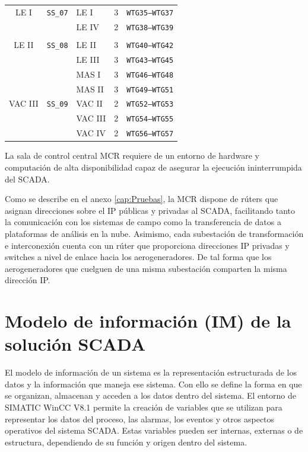 \begin{table}[tb]
{\begin{tabular}{cclcc}
                  &                 &  & &  \\ 
            \midrule
             LE I & \texttt{SS\_07} & LE I& 3 & \texttt{WTG35--WTG37} \\
                  &                 & LE IV & 2 & \texttt{WTG38--WTG39} \\
                  &                 &  & &  \\ 
            \midrule
             LE II & \texttt{SS\_08} & LE II& 3 & \texttt{WTG40--WTG42} \\
                  &                 & LE III & 3 & \texttt{WTG43--WTG45} \\
                  &                 & MAS I& 3 & \texttt{WTG46--WTG48}  \\ 
                  &                 & MAS II & 3 &  \texttt{WTG49--WTG51}\\ 
            \midrule
            VAC III& \texttt{SS\_09} & VAC II & 2 & \texttt{WTG52--WTG53} \\
                  &                 & VAC III & 2 & \texttt{WTG54--WTG55} \\
                  &                 & VAC IV & 2 & \texttt{WTG56--WTG57} \\ 
    
            \bottomrule
        \end{tabular}%
    }
\end{table}

La sala de control central \ac{MCR} requiere de un entorno de hardware y computación de alta disponibilidad capaz de asegurar la ejecución ininterrumpida del SCADA.\par 

Como se describe en el anexo \ref{cap:Pruebas}, la \ac{MCR} dispone de rúters que asignan direcciones sobre el \ac{IP} públicas y privadas al \ac{SCADA}, facilitando tanto la comunicación con los sistemas de campo como la transferencia de datos a plataformas de análisis en la nube. Asimismo, cada subestación de transformación e interconexión cuenta con un rúter que proporciona direcciones \ac{IP} privadas y switches a nivel de enlace hacia los aerogeneradores. De tal forma que los aerogeneradores que cuelguen de una misma subestación comparten la misma dirección \ac{IP}.\par
\section{Modelo de información (IM) de la solución SCADA}
\label{cap:modelo_informacion}
El modelo de información de un sistema es la representación estructurada de los datos y la información que maneja ese sistema. Con ello se define la forma en que se organizan, almacenan y acceden a los datos dentro del sistema. El entorno de SIMATIC WinCC V8.1 permite la creación de variables que se utilizan para representar los datos del proceso, las alarmas, los eventos y otros aspectos operativos del sistema SCADA. Estas variables pueden ser internas, externas o de estructura, dependiendo de su función y origen dentro del sistema. \par

